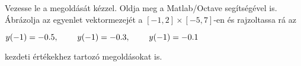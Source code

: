 Vezesse le a 
\de{} megoldását kézzel. 
Oldja meg a Matlab/Octave   segítségével is. 
Ábrázolja az egyenlet vektormezejét a 
$[-1,2]\times [-5,7]$-en és rajzoltassa rá 
az 
\centerline{$y(-1)=-0.5, \hspace{0.8cm} y(-1)=-0.3, \hspace{0.8cm} y(-1)=-0.1$} 
kezdeti értékekhez tartozó megoldásokat is.


